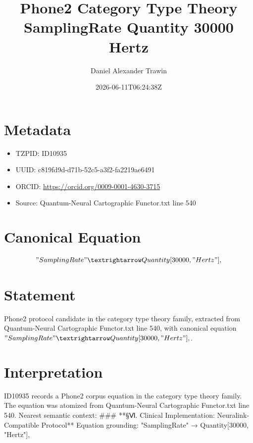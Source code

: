 \documentclass[11pt]{article}
\title{Phone2 Category Type Theory SamplingRate Quantity 30000 Hertz}
\author{Daniel Alexander Trawin}
\date{2026-06-11T06:24:38Z}
\begin{document}
\maketitle
\section*{Metadata}
\begin{itemize}
\item TZPID: ID10935
\item UUID: c819fd9d-d71b-52c5-a3f2-fa2219ae6491
\item ORCID: \url{https://orcid.org/0009-0001-4630-3715}
\item Source: Quantum-Neural Cartographic Functor.txt line 540
\end{itemize}
\section*{Canonical Equation}
\[
"SamplingRate" → Quantity[30000, "Hertz"],
\]
\section*{Statement}
Phone2 protocol candidate in the category type theory family, extracted from Quantum-Neural Cartographic Functor.txt line 540, with canonical equation $"SamplingRate" → Quantity[30000, "Hertz"],$.
\section*{Interpretation}
ID10935 records a Phone2 corpus equation in the category type theory family. The equation was atomized from Quantum-Neural Cartographic Functor.txt line 540. Nearest semantic context: ### **§Ⅵ. Clinical Implementation: Neuralink-Compatible Protocol** Equation grounding: "SamplingRate" → Quantity[30000, "Hertz"],
\end{document}
